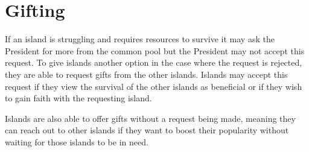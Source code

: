 \section{Gifting}  
\label{sec:IITO:gifting}  


If an island is struggling and requires resources to survive it may ask the President for more from the common pool but the President may not accept this request. To give islands another option in the case where the request is rejected, they are able to request gifts from the other islands. Islands may accept this request if they view the survival of the other islands as beneficial or if they wish to gain faith with the requesting island.

Islands are also able to offer gifts without a request being made, meaning they can reach out to other islands if they want to boost their popularity without waiting for those islands to be in need.